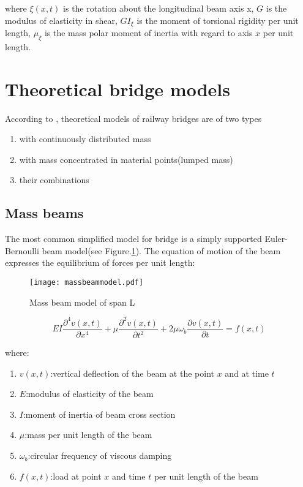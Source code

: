 where $ \xi (x,t) $ is the rotation about the longitudinal beam axis x, $ G $ is the modulus of elasticity in shear, $ GI_\xi $ is the moment of torsional rigidity per unit length, $ \mu_\xi $ is the mass polar moment of inertia with regard to axis $ x $ per unit length.



\section{Theoretical bridge models}
According to \cite[Chapter.2]{fryba1996dynamics}, theoretical models of railway bridges are of two types

\begin{enumerate}[-]
	\item with continuously distributed mass
	\item with mass concentrated in material points(lumped mass)
	\item their combinations
\end{enumerate}

\subsection{Mass beams}
The most common simplified model for bridge is a simply supported Euler-Bernoulli beam model(see Figure.\ref{fig:massbeammodel}). The equation of motion of the beam expresses the equilibrium of forces per unit length:

\begin{figure}[h]
	\centering
	\texttt{[image: massbeammodel.pdf]}
	\caption{Mass beam model of span L}
	\label{fig:massbeammodel}
\end{figure}

\begin{equation}
	EI\dfrac{\partial^4v(x,t)}{\partial x^4}+\mu \dfrac{\partial^2 v(x,t)}{\partial t^2} + 2\mu \omega_b \dfrac{\partial v(x,t)}{\partial t} = f(x,t)
	\label{eq:massbeammodel}
\end{equation}

where:
\begin{enumerate}[]
	\item $ v(x,t) $:vertical deflection of the beam at the point $ x $ and at time $ t $
	\item $ E $:modulus of elasticity of the beam
	\item $ I $:moment of inertia of beam cross section
	\item $ \mu $:mass per unit length of the beam
	\item $ \omega_b $:circular frequency of viscous damping
	\item $ f(x,t) $:load at point $ x $ and time $ t $ per unit length of the beam
\end{enumerate}

